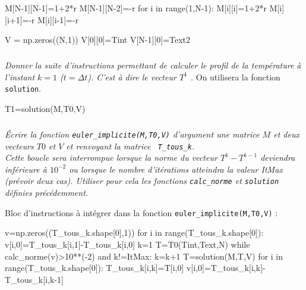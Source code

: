 \documentclass[10pt,fleqn]{article} %
\begin{document}
\begin{multicols}{2}
\begin{multicols}{2}
\begin{corrige}
\begin{python}
M[N-1][N-1]=1+2*r
M[N-1][N-2]=-r
for i in range(1,N-1):
    M[i][i]=1+2*r
    M[i][i+1]=-r
    M[i][i-1]=-r

V = np.zeros((N,1))
V[0][0]=Tint
V[N-1][0]=Text2
\end{python}
\end{corrige}

\else
\fi


\subparagraph{}
\textit{Donner la suite d'instructions permettant de calculer le profil de la température à 
l'instant $k=1$ ($t=\Delta t$). C'est à dire le vecteur $T^1$ .}
On utilisera la fonction  \texttt{solution}.%
\ifprof

\begin{corrige}
\begin{python}
T1=solution(M,T0,V)
\end{python}
\end{corrige}
\else
\fi


\subparagraph{}
\textit{Écrire la fonction \texttt{euler\_implicite(M,T0,V)} d'argument une matrice $M$ et 
deux vecteurs $T0$ et $V$ et renvoyant la matrice \texttt{ T\_tous\_k}.\\
Cette boucle sera interrompue lorsque la norme  du vecteur $T^k-T^{k-1}$ deviendra inférieure à $10^{-2}$ ou lorsque le nombre d'itérations atteindra la valeur ItMax (prévoir deux cas). Utiliser pour cela les fonctions \texttt{calc\_norme} et \texttt{solution} définies précédemment.}
\ifprof


\begin{corrige}
Bloc d'instructions à intégrer dans la fonction \texttt{euler\_implicite(M,T0,V)} :
\begin{python}
v=np.zeros((T_tous_k.shape[0],1))
for i in range(T_tous_k.shape[0]):
    v[i,0]=T_tous_k[i,1]-T_tous_k[i,0]
k=1
T=T0(Tint,Text,N)
while calc_norme(v)>10**(-2) and k!=ItMax:
    k=k+1
    T=solution(M,T,V)
    for i in range(T_tous_k.shape[0]):
        T_tous_k[i,k]=T[i,0]
        v[i,0]=T_tous_k[i,k]-T_tous_k[i,k-1]
\end{python}        
\end{corrige}
\else
\fi




\end{multicols}
\end{multicols}
\end{document}
